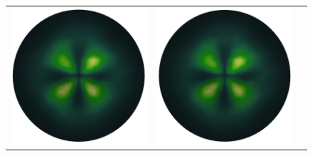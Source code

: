 \begin{figure}[H]
\begin{center}
\begin{tabular}[c]{c c c}
			\includegraphics[scale=.15]{recoveredVelocity_noglyphs.png} &
			\includegraphics[scale=.15]{trueVelocity_noglyphs.png} &

\end{tabular}
\end{center}
\end{figure}
